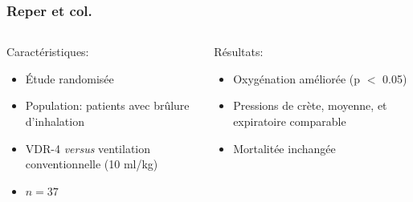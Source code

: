 \begin{frame}
	\frametitle{Reper et col.}
	\begin{columns}[onlytextwidth]

	\begin{block}{Caractéristiques:}

	\begin{itemize}
		\item Étude randomisée
		\item Population: patients avec brûlure d'inhalation
		\item VDR-4 \textit{versus} ventilation conventionnelle (10 ml/kg)
		\item $n=37$
	\end{itemize}
	\end{block}

	\begin{block}{Résultats:}

	\begin{itemize}
		\item Oxygénation améliorée (p $<$ 0.05)
		\item Pressions de crète, moyenne, et expiratoire comparable
		\item Mortalitée inchangée
	\end{itemize}
	\end{block}
	
	\end{columns}
\end{frame}
